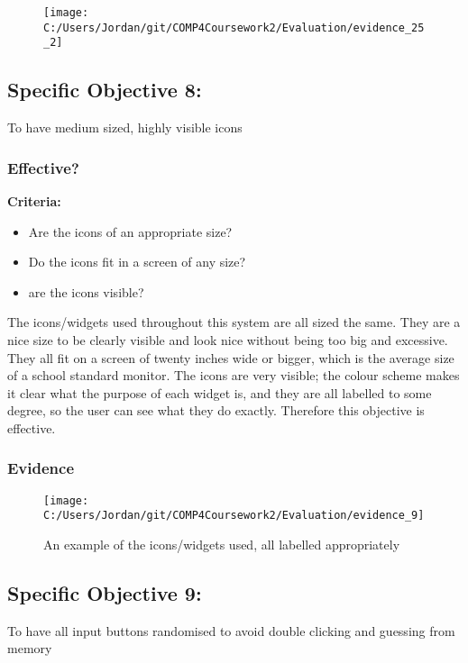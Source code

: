 \begin{figure}[H]
	\texttt{[image: C:/Users/Jordan/git/COMP4Coursework2/Evaluation/evidence\_25\_2]}
\end{figure}

\subsection{Specific Objective 8: }

To have medium sized, highly visible icons

\subsubsection{Effective?}

\textbf{Criteria: }

\begin{itemize}
	\item Are the icons of an appropriate size?
	\item Do the icons fit in a screen of any size?
	\item are the icons visible?
\end{itemize}

The icons/widgets used throughout this system are all sized the same. They are a nice size to be clearly visible and look nice without being too big and excessive. They all fit on a screen of twenty inches wide or bigger, which is the average size of a school standard monitor. The icons are very visible; the colour scheme makes it clear what the purpose of each widget is, and they are all labelled to some degree, so the user can see what they do exactly. Therefore this objective is effective.

\subsubsection{Evidence}

\begin{figure}[H]
	\texttt{[image: C:/Users/Jordan/git/COMP4Coursework2/Evaluation/evidence\_9]}
	\caption{An example of the icons/widgets used, all labelled appropriately}
\end{figure}

\subsection{Specific Objective 9: }

To have all input buttons randomised to avoid double clicking and guessing from memory

